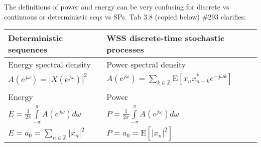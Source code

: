 \documentclass{article}
\begin{document}
The definitions of power and energy can be very confusing for discrete vs continuous or deterministic seqs vs SPs. Tab 3.8 (copied below) \#293  clarifies:

\begin{table}[h!]
\centering
\small
\begin{tabular}{l l} \hline
\textbf{Deterministic  sequences} & \textbf{WSS discrete-time stochastic processes} \\\hline\hline
Energy spectral density & Power spectral density\\
$A(e^{j\omega})=|X(e^{j\omega})|^2$ & $A(e^{j\omega})=\sum\limits_{k\in\mathbb{Z}}\text{E}[x_nx^{*}_{n-k}e^{-j\omega k}]$ \\ 
 & \\
 Energy & Power \\
 $E=\frac{1}{2\pi}\int\limits_{-\pi}^{\pi}A(e^{j\omega})d\omega$ &
 $P=\frac{1}{2\pi}\int\limits_{-\pi}^{\pi}A(e^{j\omega})d\omega$ \\
 $E = a_0 = \sum\limits_{n\in\mathbb{Z}}|x_n|^2$  & $P=a_0=\text{E}[|x_n|^2]$ \\ \hline
\end{tabular}
\end{table}



\end{document}
